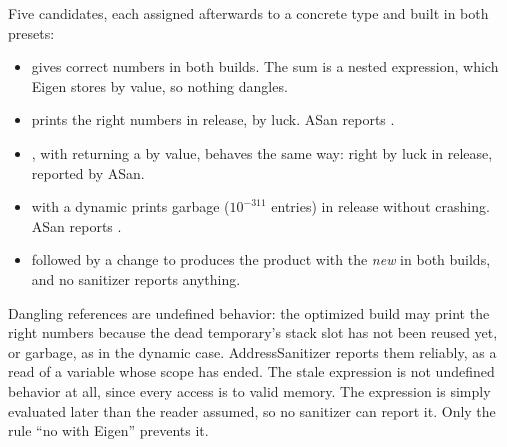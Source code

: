 \begin{solutions}
  \item Five candidates, each assigned afterwards to a concrete type and built in both presets:
        \begin{itemize}
          \item {} gives correct numbers in both builds. The sum is a nested expression, which Eigen stores by value, so nothing dangles.
          \item {} prints the right numbers in release, by luck. ASan reports .
          \item {}, with  returning a  by value, behaves the same way: right by luck in release, reported by ASan.
          \item {} with a dynamic  prints garbage ($10^{-311}$ entries) in release without crashing.
                ASan reports .
          \item {} followed by a change to  produces the product with the \emph{new}  in both builds, and no sanitizer reports anything.
        \end{itemize}
        Dangling references are undefined behavior: the optimized build may print the right numbers because
        the dead temporary's stack slot has not been reused yet, or garbage, as in the dynamic case. AddressSanitizer reports them reliably, as a read of a variable
        whose scope has ended. The stale expression is not undefined behavior at all, since every access is to valid memory. The expression is simply evaluated
        later than the reader assumed, so no sanitizer can report it. Only the rule ``no  with Eigen'' prevents it.


\end{solutions}
